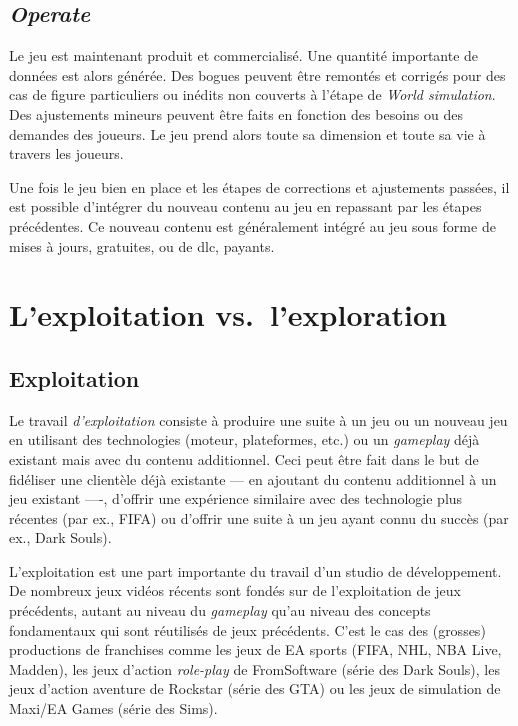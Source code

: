 \subsection{\emph{Operate}}
Le jeu est maintenant produit et commercialisé.
Une quantité importante de données est alors générée.
Des bogues peuvent être remontés et corrigés pour des cas de figure particuliers ou inédits non couverts \`a l'étape de \emph{World simulation}.
Des ajustements mineurs peuvent être faits en fonction des besoins ou des demandes des joueurs.
Le jeu prend alors toute sa dimension et toute sa vie à travers les joueurs.

Une fois le jeu bien en place et les étapes de corrections et ajustements passées, il est possible d'intégrer du nouveau contenu au jeu en repassant par les étapes précédentes.
Ce nouveau contenu est généralement intégré au jeu sous forme de mises à jours, gratuites, ou de \gls{dlc}, payants.



\section{L'exploitation vs.\ l'exploration}
\subsection{Exploitation}
Le travail \emph{d'exploitation} consiste à produire une suite à un jeu ou un nouveau jeu en utilisant des technologies (moteur, plateformes, etc.) ou un \emph{gameplay} déjà existant mais avec du contenu additionnel.
Ceci peut être fait dans le but de fidéliser une clientèle déjà existante --- en ajoutant du contenu additionnel à un jeu existant ----, d'offrir une expérience similaire avec des technologie plus récentes (par ex., FIFA) ou d'offrir une suite à un jeu ayant connu du succès (par ex., Dark Souls).

L'exploitation est une part importante du travail d'un studio de développement.
De nombreux jeux vidéos récents sont fondés sur de l'exploitation de jeux précédents, autant au niveau du \emph{gameplay} qu'au niveau des concepts fondamentaux qui sont r\'eutilis\'es de jeux précédents.
C'est le cas des (grosses) productions de franchises comme les jeux de EA sports (FIFA, NHL, NBA Live, Madden), les jeux d'action \emph{role-play} de FromSoftware (série des Dark Souls), les jeux d'action aventure de Rockstar (série des GTA) ou les jeux de simulation de Maxi/EA Games (série des Sims). 

